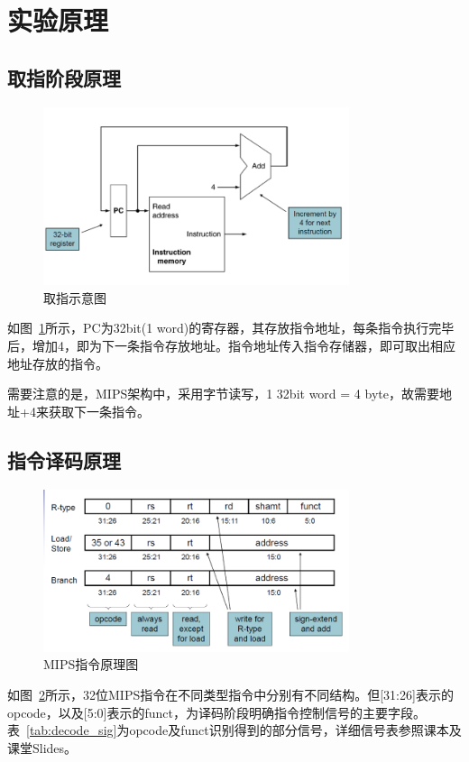 \section{实验原理}\label{section:section_3}
\subsection{取指阶段原理}
\begin{figure}[htbp]
    \centering
    \includegraphics[width = 0.8\textwidth]{image/3_section/fetch.png}
    \caption{取指示意图}
    \label{fig:fetch}
\end{figure}

如图~\ref{fig:fetch}所示，PC为32bit(1 word)的寄存器，其存放指令地址，每条指令执行完毕后，增加4，即为下一条指令存放地址。指令地址传入指令存储器，即可取出相应地址存放的指令。
	
需要注意的是，MIPS架构中，采用字节读写，1 32bit word = 4 byte，故需要地址+4来获取下一条指令。

\subsection{指令译码原理}
\begin{figure}[htbp]
    \centering
    \includegraphics[width = 0.8\textwidth]{image/3_section/instruction.png}
    \caption{MIPS指令原理图}
    \label{fig:instruction}
\end{figure}
如图~\ref{fig:instruction}所示，32位MIPS指令在不同类型指令中分别有不同结构。但[31:26]表示的opcode，以及[5:0]表示的funct，为译码阶段明确指令控制信号的主要字段。表~\ref{tab:decode_sig}为opcode及funct识别得到的部分信号，详细信号表参照课本及课堂Slides。

